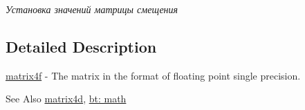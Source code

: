 \begin{DoxyCompactItemize}
\begin{DoxyCompactList}\small\item\em Установка значений матрицы смещения \end{DoxyCompactList}\end{DoxyCompactItemize}


\subsection{Detailed Description}
\hyperlink{classbt_1_1matrix4f}{matrix4f} -\/ The matrix in the format of floating point single precision. 

\begin{DoxySeeAlso}{See Also}
\hyperlink{classbt_1_1matrix4d}{matrix4d}, \hyperlink{group__math}{bt\-: math} 
\end{DoxySeeAlso}


